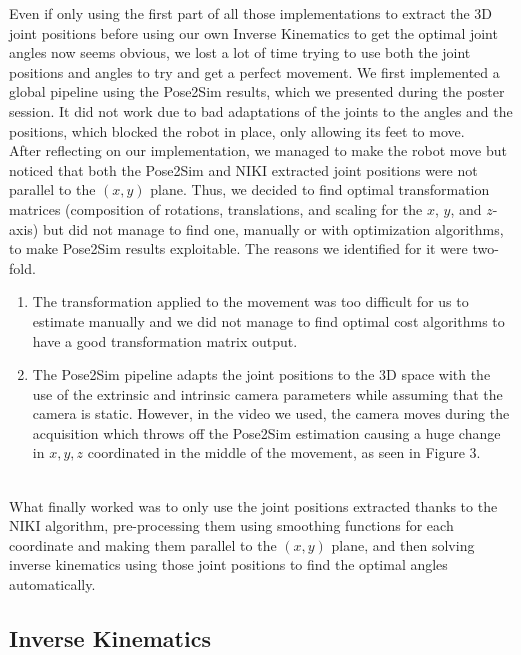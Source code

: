 \documentclass{amsart}
\theoremstyle{definition}
\theoremstyle{plain}
\begin{document}
Even if only using the first part of all those implementations to extract the 3D joint positions before using our own Inverse Kinematics to get the optimal joint angles now seems obvious, we lost a lot of time trying to use both the joint positions and angles to try and get a perfect movement. We first implemented a global pipeline using the Pose2Sim results, which we presented during the poster session. It did not work due to bad adaptations of the joints to the angles and the positions, which blocked the robot in place, only allowing its feet to move. 
\\

After reflecting on our implementation, we managed to make the robot move but noticed that both the Pose2Sim and NIKI extracted joint positions were not parallel to the $(x, y)$ plane. Thus, we decided to find optimal transformation matrices (composition of rotations, translations, and scaling for the $x$, $y$, and $z$-axis) but did not manage to find one, manually or with optimization algorithms, to make Pose2Sim results exploitable. The reasons we identified for it were two-fold.

\begin{enumerate}
    \item The transformation applied to the movement was too difficult for us to estimate manually and we did not manage to find optimal cost algorithms to have a good transformation matrix output.
    \item The Pose2Sim pipeline adapts the joint positions to the 3D space with the use of the extrinsic and intrinsic camera parameters while assuming that the camera is static. However, in the video we used, the camera moves during the acquisition which throws off the Pose2Sim estimation causing a huge change in $x,y,z$ coordinated in the middle of the movement, as seen in Figure 3.
\end{enumerate}
\\

What finally worked was to only use the joint positions extracted thanks to the NIKI algorithm, pre-processing them using smoothing functions for each coordinate and making them parallel to the $(x, y)$ plane, and then solving inverse kinematics using those joint positions to find the optimal angles automatically. 

\subsection{Inverse Kinematics}
\end{document}
